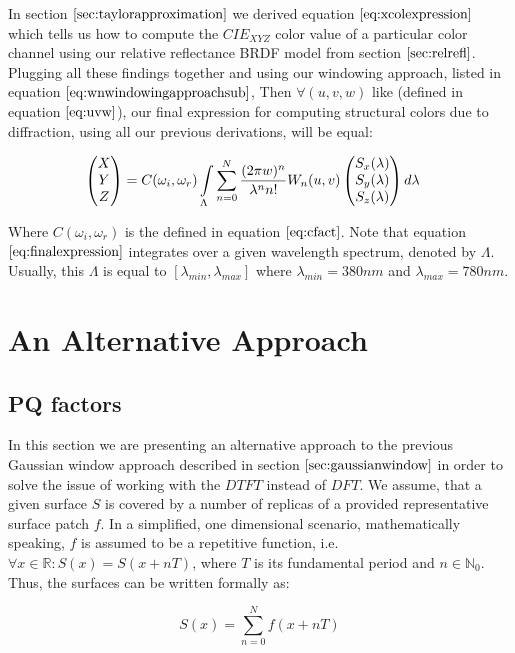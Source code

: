 In section $\ref{sec:taylorapproximation}$ we derived equation $\ref{eq:xcolexpression}$ which tells us how to compute the $CIE_{XYZ}$ color value of a particular color channel using our relative reflectance BRDF model from section $\ref{sec:relrefl}$. Plugging all these findings together and using our windowing approach, listed in equation $\ref{eq:wnwindowingapproachsub}$, Then $\forall (u,v,w)$ like (defined in equation $\ref{eq:uvw}$), our final expression for computing structural colors due to diffraction, using all our previous derivations, will be equal:

\begin{equation}
\begin{split}
\colvec[X]{Y}{Z}& = C(\omega_i,\omega_r) \int \limits_{\Lambda} \sum_{n=0}^N  \frac{(2 \pi w)^n}{\lambda^n n!} W_{n}(u,v) \colvec[S_x(\lambda)]{S_y(\lambda)}{S_z(\lambda)}d\lambda
\end{split}
\label{eq:finalexpression}
\end{equation}

Where $C(\omega_i,\omega_r)$ is the defined in equation $\ref{eq:cfact}$. Note that equation $\ref{eq:finalexpression}$ integrates over a given wavelength spectrum, denoted by $\Lambda$. Usually, this $\Lambda$ is equal to $[\lambda_{min}, \lambda_{max}]$ where $\lambda_{min} = 380nm$ and $\lambda_{max}=780nm$. \\

\section{An Alternative Approach}
\subsection{PQ factors}
\label{sec:pq}
In this section we are presenting an alternative approach to the previous Gaussian window approach described in section $\ref{sec:gaussianwindow}$ in order to solve the issue of working with the $DTFT$ instead of $DFT$. We assume, that a given surface $S$ is covered by a number of replicas of a provided representative surface patch $f$. In a simplified, one dimensional scenario, mathematically speaking, $f$ is assumed to be a repetitive function, i.e. $\forall x \in \mathds{R} : S(x) = S(x+nT)$, where $T$ is its fundamental period and $n \in \mathds{N}_{0}$. Thus, the surfaces can be written formally as:

\begin{equation}
  S(x) = \sum_{n=0}^N f(x+nT)
\label{eq:replicatedpatchsurface}
\end{equation}

